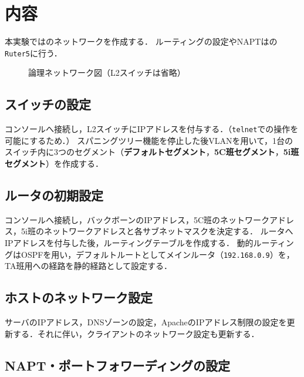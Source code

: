 \section{内容}
本実験ではのネットワークを作成する．
ルーティングの設定やNAPTはの\texttt{Ruter5}に行う．
\begin{figure}
    \centering
    
    \caption{論理ネットワーク図（L2スイッチは省略）}
    \label{fig:ネットワーク図}
\end{figure}
\subsection{スイッチの設定}
コンソールへ接続し，L2スイッチにIPアドレスを付与する．（\texttt{telnet}での操作を可能にするため．）
スパニングツリー機能を停止した後VLANを用いて，1台のスイッチ内に3つのセグメント（\textbf{デフォルトセグメント}，\textbf{5C班セグメント}，\textbf{5i班セグメント}）を作成する．
\subsection{ルータの初期設定}
コンソールへ接続し，バックボーンのIPアドレス，5C班のネットワークアドレス，5i班のネットワークアドレスと各サブネットマスクを決定する．
ルータへIPアドレスを付与した後，ルーティングテーブルを作成する．
動的ルーティングはOSPFを用い，デフォルトルートとしてメインルータ（\texttt{192.168.0.9}）を，TA班用への経路を静的経路として設定する．
\subsection{ホストのネットワーク設定}
サーバのIPアドレス，DNSゾーンの設定，ApacheのIPアドレス制限の設定を更新する．それに伴い，クライアントのネットワーク設定も更新する．
\subsection{NAPT・ポートフォワーディングの設定}
